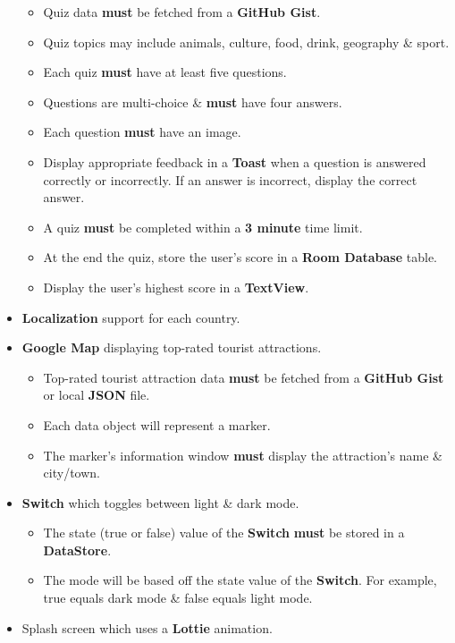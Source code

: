 \documentclass{article}
\begin{document}
\begin{itemize}
	      \begin{itemize}
	      	\item Quiz data \textbf{must} be fetched from a \textbf{GitHub Gist}.
	      	\item Quiz topics may include animals, culture, food, drink, geography \& sport.
	      	\item Each quiz \textbf{must} have at least five questions.
	      	\item Questions are multi-choice \& \textbf{must} have four answers.
	      	\item Each question \textbf{must} have an image.
	      	\item Display appropriate feedback in a \textbf{Toast} when a question is answered correctly or incorrectly. If an answer is incorrect, display the correct answer.
	      	\item A quiz \textbf{must} be completed within a \textbf{3 minute} time limit.
	      	\item At the end the quiz, store the user's score in a \textbf{Room Database} table.
	      	\item Display the user's highest score in a \textbf{TextView}.
	      \end{itemize}
	\item \textbf{Localization} support for each country.
	\item \textbf{Google Map} displaying top-rated tourist attractions. 
	      \begin{itemize}
	      	\item Top-rated tourist attraction data \textbf{must} be fetched from a \textbf{GitHub Gist} or local \textbf{JSON} file.
	      	\item Each data object will represent a marker.
	      	\item The marker's information window \textbf{must} display the attraction's name \& city/town.
	      \end{itemize}
	\item \textbf{Switch} which toggles between light \& dark mode.
	      \begin{itemize}
	      	\item The state (true or false) value of the \textbf{Switch} \textbf{must} be stored in a \textbf{DataStore}.
	      	\item The mode will be based off the state value of the \textbf{Switch}. For example, true equals dark mode \& false equals light mode.
	      \end{itemize}
	\item Splash screen which uses a \textbf{Lottie} animation.

\end{itemize}
\end{document}
